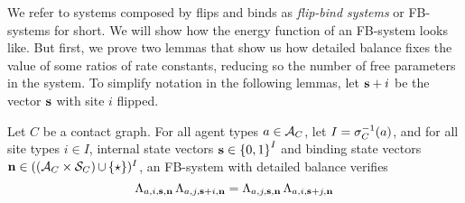 We refer to systems composed by flips and binds
as \emph{flip-bind systems} or FB-systems for short.
We will show how the energy function of an FB-system looks like.
But first, we prove two lemmas that show us how detailed balance
fixes the value of some ratios of rate constants,
reducing so the number of free parameters in the system.
To simplify notation in the following lemmas,
let $\boldsymbol{\mathbf{s}}+i$ be the vector $\boldsymbol{\mathbf{s}}$
with site $i$ flipped.

\begin{lemma}
  \label{lemma:flipflip}
  Let $C$ be a contact graph.
  For all agent types $a \in \mathcal{A}_C$,
  let $I = \sigma_C^{-1}(a)$,
  and for all
  site types $i \in I$, %
  internal state vectors
  $\boldsymbol{\mathbf{s}} \in \left\{ 0,1 \right\}^I$ and
  binding state vectors
  $\boldsymbol{\mathbf{n}} \in ((\mathcal{A}_C\times\mathcal{S}_C)\operatorname*{\cup}\left\{ \star \right\})^I$,
  an FB-system with detailed balance verifies
  \begin{equation}
    \label{eq:flipflip}
    \Lambda_{a,i,\boldsymbol{\mathbf{s}},\boldsymbol{\mathbf{n}}} \,
    \Lambda_{a,j,\boldsymbol{\mathbf{s}}+i,\boldsymbol{\mathbf{n}}} =
    \Lambda_{a,j,\boldsymbol{\mathbf{s}},\boldsymbol{\mathbf{n}}} \,
    \Lambda_{a,i,\boldsymbol{\mathbf{s}}+j,\boldsymbol{\mathbf{n}}}
  \end{equation}
\end{lemma}
